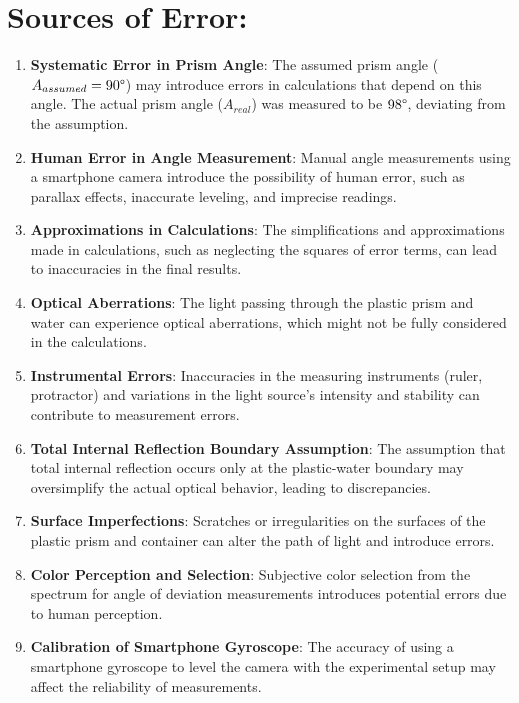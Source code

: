 \documentclass[twocolumn,11pt]{article}
\begin{document}
\section{Sources of Error:}
\begin{enumerate}
    \item \textbf{Systematic Error in Prism Angle}: The assumed prism angle ($A_{assumed} = 90\degree$) may introduce errors in calculations that depend on this angle. The actual prism angle ($A_{real}$) was measured to be $98\degree$, deviating from the assumption.
    

    \item \textbf{Human Error in Angle Measurement}: Manual angle measurements using a smartphone camera introduce the possibility of human error, such as parallax effects, inaccurate leveling, and imprecise readings.

    \item \textbf{Approximations in Calculations}: The simplifications and approximations made in calculations, such as neglecting the squares of error terms, can lead to inaccuracies in the final results.

    \item \textbf{Optical Aberrations}: The light passing through the plastic prism and water can experience optical aberrations, which might not be fully considered in the calculations.

    \item \textbf{Instrumental Errors}: Inaccuracies in the measuring instruments (ruler, protractor) and variations in the light source's intensity and stability can contribute to measurement errors.

    \item \textbf{Total Internal Reflection Boundary Assumption}: The assumption that total internal reflection occurs only at the plastic-water boundary may oversimplify the actual optical behavior, leading to discrepancies.

    \item \textbf{Surface Imperfections}: Scratches or irregularities on the surfaces of the plastic prism and container can alter the path of light and introduce errors.

    \item \textbf{Color Perception and Selection}: Subjective color selection from the spectrum for angle of deviation measurements introduces potential errors due to human perception.

    \item \textbf{Calibration of Smartphone Gyroscope}: The accuracy of using a smartphone gyroscope to level the camera with the experimental setup may affect the reliability of measurements.


\end{enumerate}
\end{document}
